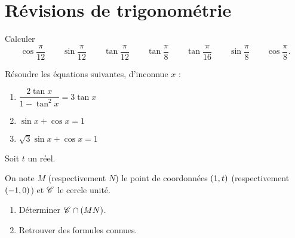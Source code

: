 \chapter{Révisions de trigonométrie}

\minitoc

\begin{exo}[Exercice 1]
Calculer \[\cos\dfrac{\pi}{12}\qquad\sin\dfrac{\pi}{12}\qquad\tan\dfrac{\pi}{12}\qquad\tan\dfrac{\pi}{8}\qquad\tan\dfrac{\pi}{16}\qquad\sin\dfrac{\pi}{8}\qquad\cos\dfrac{\pi}{8}.\]
\end{exo}

\begin{corr}
\end{corr}

\begin{exo}[Exercice 2]
Résoudre les équations suivantes, d'inconnue \(x\) :

\begin{enumerate}
\item \(\dfrac{2\tan x}{1-\tan^2x}=3\tan x\) \\

\item \(\sin x+\cos x=1\) \\

\item \(\sqrt{3}\sin x+\cos x=1\)
\end{enumerate}
\end{exo}

\begin{corr}
\end{corr}

\begin{exo}[Exercice 3]
Soit \(t\) un réel.

On note \(M\) (respectivement \(N\)) le point de coordonnées \(\left(1,t\right)\) (respectivement \(\left(-1,0\right)\)) et \(\mathscr{C}^{}\) le cercle unité.

\begin{enumerate}
\item Déterminer \(\mathscr{C}^{}\cap\left(MN\right)\). \\

\item Retrouver des formules connues.
\end{enumerate}
\end{exo}

\begin{corr}
\end{corr}

